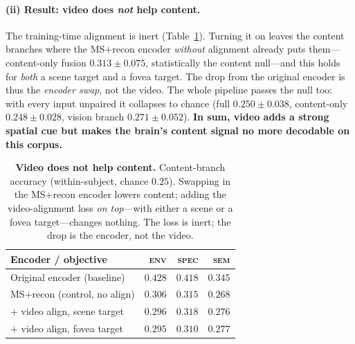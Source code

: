 \documentclass[10pt,twocolumn]{article}
\newcommand{\intraEnv}{0.428}\newcommand{\intraEnvS}{0.095}
\newcommand{\intraSpec}{0.418}\newcommand{\intraSpecS}{0.077}
\newcommand{\intraSem}{0.345}\newcommand{\intraSemS}{0.096}
\newcommand{\msrEnv}{0.306}\newcommand{\msrSpec}{0.315}\newcommand{\msrSem}{0.268}
\newcommand{\valEnv}{0.296}\newcommand{\valSpec}{0.318}\newcommand{\valSem}{0.276}   %
\newcommand{\valfEnv}{0.295}\newcommand{\valfSpec}{0.310}\newcommand{\valfSem}{0.277}%
\newcommand{\cfusedVal}{0.313}\newcommand{\cfusedValS}{0.075}
\newcommand{\nullFused}{0.250}\newcommand{\nullFusedS}{0.038}
\newcommand{\nullCfused}{0.248}\newcommand{\nullCfusedS}{0.028}
\newcommand{\nullVis}{0.271}\newcommand{\nullVisS}{0.052}
\newcommand{\pmv}[2]{$#1\!\pm\!#2$}
\begin{document}
\paragraph{(ii) Result: video does \emph{not} help content.}
The training-time alignment is inert (Table~\ref{tab:content}). Turning it on
leaves the content branches where the MS$+$recon encoder \emph{without} alignment
already puts them---content-only fusion \pmv{\cfusedVal}{\cfusedValS}, statistically
the content null---and this holds for \emph{both} a scene target and a fovea
target. The drop from the original encoder is thus the \emph{encoder swap}, not the
video. The whole pipeline passes the null too: with every input unpaired it
collapses to chance (full \pmv{\nullFused}{\nullFusedS}, content-only
\pmv{\nullCfused}{\nullCfusedS}, vision branch \pmv{\nullVis}{\nullVisS}).
\textbf{In sum, video adds a strong spatial cue but makes the brain's content
signal no more decodable on this corpus.}

\begin{table}[H]
\centering
\caption{\textbf{Video does not help content.} Content-branch accuracy
(within-subject, chance $0.25$). Swapping in the MS$+$recon encoder lowers content;
adding the video-alignment loss \emph{on top}---with either a scene or a fovea
target---changes nothing. The loss is inert; the drop is the encoder, not the video.}
\label{tab:content}
\small
\setlength{\tabcolsep}{6pt}
\begin{tabular}{@{}l r r r@{}}
\toprule
Encoder / objective & \textsc{env} & \textsc{spec} & \textsc{sem} \\
\midrule
Original encoder \footnotesize(baseline) & $\intraEnv$ & $\intraSpec$ & $\intraSem$ \\
MS$+$recon \footnotesize(control, no align) & $\msrEnv$ & $\msrSpec$ & $\msrSem$ \\
\quad $+$ video align, scene target      & $\valEnv$   & $\valSpec$   & $\valSem$ \\
\quad $+$ video align, fovea target      & $\valfEnv$  & $\valfSpec$  & $\valfSem$ \\
\bottomrule
\end{tabular}
\end{table}
\end{document}
